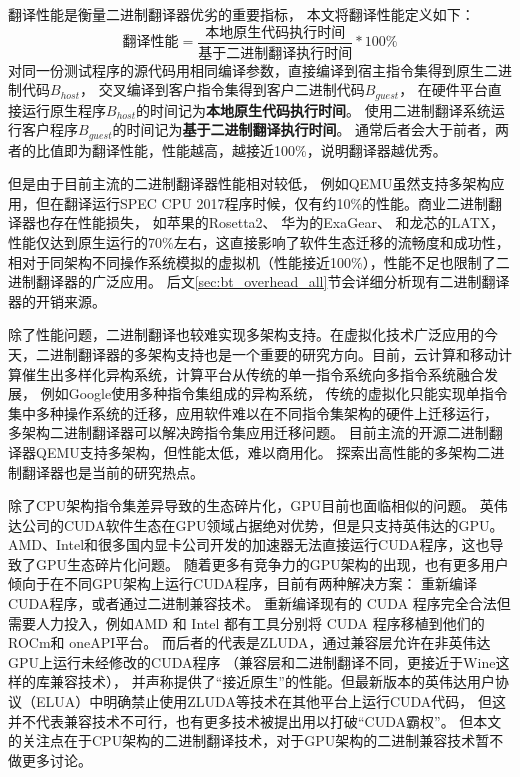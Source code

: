 翻译性能是衡量二进制翻译器优劣的重要指标，
本文将翻译性能定义如下：
\begin{equation}\label{eq:bt_performance}
    \text{翻译性能} = \frac{\text{本地原生代码执行时间}}{\text{基于二进制翻译执行时间}} * 100\%
\end{equation}
对同一份测试程序的源代码用相同编译参数，直接编译到宿主指令集得到原生二进制代码$B_{host}$，
交叉编译到客户指令集得到客户二进制代码$B_{guest}$，
在硬件平台直接运行原生程序$B_{host}$的时间记为\textbf{本地原生代码执行时间}。
使用二进制翻译系统运行客户程序$B_{guest}$的时间记为\textbf{基于二进制翻译执行时间}。
通常后者会大于前者，两者的比值即为翻译性能，性能越高，越接近100\%，说明翻译器越优秀。


但是由于目前主流的二进制翻译器性能相对较低，
例如QEMU\cite{bellardQEMUFastPortable2005}虽然支持多架构应用，但在翻译运行SPEC CPU 2017\cite{SPECCPU2017}程序时候，仅有约10\%的性能。商业二进制翻译器也存在性能损失，
如苹果的Rosetta2\cite{RosettaTranslationEnvironment, RunningIntelBinaries}、
华为的ExaGear\cite{KunPengExaGear}、
和龙芯的LATX\cite{LoongArchEnv2022, LoongArch2023}，
性能仅达到原生运行的70\%左右，这直接影响了软件生态迁移的流畅度和成功性，
相对于同架构不同操作系统模拟的虚拟机（性能接近100\%），性能不足也限制了二进制翻译器的广泛应用。
后文\ref{sec:bt_overhead_all}节会详细分析现有二进制翻译器的开销来源。

除了性能问题，二进制翻译也较难实现多架构支持。在虚拟化技术广泛应用的今天，二进制翻译器的多架构支持也是一个重要的研究方向。目前，云计算和移动计算催生出多样化异构系统，计算平台从传统的单一指令系统向多指令系统融合发展，
例如Google使用多种指令集组成的异构系统，
传统的虚拟化只能实现单指令集中多种操作系统的迁移，应用软件难以在不同指令集架构的硬件上迁移运行，
多架构二进制翻译器可以解决跨指令集应用迁移问题。
目前主流的开源二进制翻译器QEMU支持多架构，但性能太低，难以商用化。
探索出高性能的多架构二进制翻译器也是当前的研究热点。

除了CPU架构指令集差异导致的生态碎片化，GPU目前也面临相似的问题。
英伟达公司的CUDA软件生态在GPU领域占据绝对优势，但是只支持英伟达的GPU。
AMD、Intel和很多国内显卡公司开发的加速器无法直接运行CUDA程序，这也导致了GPU生态碎片化问题。
随着更多有竞争力的GPU架构的出现，也有更多用户倾向于在不同GPU架构上运行CUDA程序，目前有两种解决方案：
重新编译CUDA程序，或者通过二进制兼容技术。
重新编译现有的 CUDA 程序完全合法但需要人力投入，例如AMD 和 Intel 都有工具分别将 CUDA 程序移植到他们的 ROCm和 oneAPI平台。
而后者的代表是ZLUDA\cite{ZLUDA}，通过兼容层允许在非英伟达GPU上运行未经修改的CUDA程序
（兼容层和二进制翻译不同，更接近于Wine这样的库兼容技术），
并声称提供了“接近原生”的性能。但最新版本的英伟达用户协议（ELUA）中明确禁止使用ZLUDA等技术在其他平台上运行CUDA代码，
但这并不代表兼容技术不可行，也有更多技术被提出用以打破“CUDA霸权”。
但本文的关注点在于CPU架构的二进制翻译技术，对于GPU架构的二进制兼容技术暂不做更多讨论。



